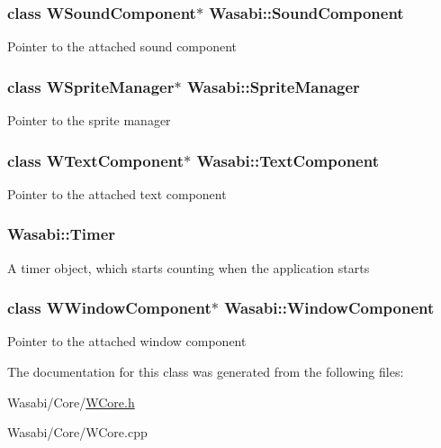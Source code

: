 \subsubsection[{\texorpdfstring{Sound\+Component}{SoundComponent}}]{\setlength{\rightskip}{0pt plus 5cm}class {\bf W\+Sound\+Component}$\ast$ Wasabi\+::\+Sound\+Component}\hypertarget{class_wasabi_a540e3cbb2acb4c729c85d36c791d38cc}{}\label{class_wasabi_a540e3cbb2acb4c729c85d36c791d38cc}
Pointer to the attached sound component 
\subsubsection[{\texorpdfstring{Sprite\+Manager}{SpriteManager}}]{\setlength{\rightskip}{0pt plus 5cm}class {\bf W\+Sprite\+Manager}$\ast$ Wasabi\+::\+Sprite\+Manager}\hypertarget{class_wasabi_acfadaed04b0685921e3029e0b2e15c8b}{}\label{class_wasabi_acfadaed04b0685921e3029e0b2e15c8b}
Pointer to the sprite manager 
\subsubsection[{\texorpdfstring{Text\+Component}{TextComponent}}]{\setlength{\rightskip}{0pt plus 5cm}class {\bf W\+Text\+Component}$\ast$ Wasabi\+::\+Text\+Component}\hypertarget{class_wasabi_afc9ad7c44b8982559eaa53b67674b4b1}{}\label{class_wasabi_afc9ad7c44b8982559eaa53b67674b4b1}
Pointer to the attached text component 
\subsubsection[{\texorpdfstring{Timer}{Timer}}]{ Wasabi\+::\+Timer}\hypertarget{class_wasabi_a05041643bd932c46b688cc6a941e99c7}{}\label{class_wasabi_a05041643bd932c46b688cc6a941e99c7}
A timer object, which starts counting when the application starts 
\subsubsection[{\texorpdfstring{Window\+Component}{WindowComponent}}]{\setlength{\rightskip}{0pt plus 5cm}class {\bf W\+Window\+Component}$\ast$ Wasabi\+::\+Window\+Component}\hypertarget{class_wasabi_a724bc55c16357768ce83265e252e99f4}{}\label{class_wasabi_a724bc55c16357768ce83265e252e99f4}
Pointer to the attached window component 

The documentation for this class was generated from the following files\+:\begin{DoxyCompactItemize}
\item 
Wasabi/\+Core/\hyperlink{_w_core_8h}{W\+Core.\+h}\item 
Wasabi/\+Core/W\+Core.\+cpp\end{DoxyCompactItemize}
